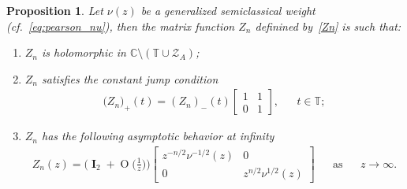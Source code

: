 \documentclass[12pt]{amsart}
\newtheorem{proposition}{Proposition}[section]
\newcommand{\dde}{\operatorname e}
\begin{document}
\begin{proposition}\label{teo48} 
Let \( \nu (z) %
 \) be a
generalized 
semiclassical weight (cf.~\eqref{eq:pearson_nu}), then the matrix function \( Z_n \) definined by~\eqref{Zn} is 
such that:
\begin{enumerate}[\rm i)]
\item
\( Z_n \) is holomorphic in \( \mathbb{C}\setminus ( \mathbb{T} \cup \mathcal{Z}_A ) \);
\item
\( Z_n \) satisfies the constant jump condition
\begin{align*}
{(Z_n})_{+}(t)={(Z_n)}_{-}(t)
\begin{bmatrix}
1 & 1\\
0 & 1
\end{bmatrix}, && t\in\mathbb{T};
\end{align*}
\item
\( Z_n \) has the following asymptotic behavior at infinity
\begin{align*}
Z_n(z)
= 
\Big( \mathbf{\operatorname I}_2 + \operatorname{O} \big( \frac 1 z \big) \Big)
\begin{bmatrix}
z^{-n/2}\nu^{-1/2}(z) & 0\\
0 & z^{n/2}\nu^{1/2}(z) 
\end{bmatrix}
&&
\text{as} && z\to\infty .
\end{align*}
\end{enumerate}
\end{proposition} 
\end{document}
